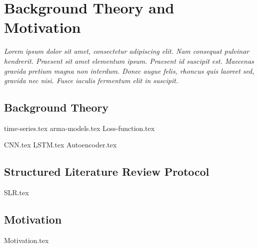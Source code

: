\chapter{Background Theory and Motivation}\label{T-B}
\label{cha:TheoryAndBackground}

{\it Lorem ipsum dolor sit amet, consectetur adipiscing elit. Nam consequat pulvinar hendrerit. Praesent sit amet elementum ipsum. Praesent id suscipit est. Maecenas gravida pretium magna non interdum. Donec augue felis, rhoncus quis laoreet sed, gravida nec nisi. Fusce iaculis fermentum elit in suscipit.}



\section{Background Theory}
\label{sec:no1}
{time-series.tex}
{arma-models.tex}
{Loss-function.tex}

{CNN.tex}
{LSTM.tex}
{Autoencoder.tex}



\section{Structured Literature Review Protocol}
{SLR.tex}



\section{Motivation}
\label{sec:no2}
{Motivation.tex}
